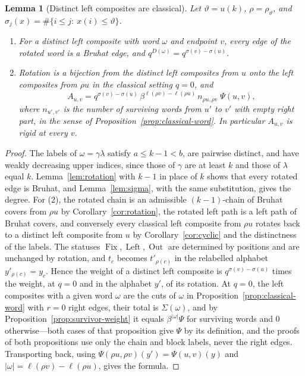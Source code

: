 \documentclass[11pt]{article}
\newtheorem{lemma}[proposition]{Lemma}
\newcommand{\Fix}{\operatorname{Fix}}
\newcommand{\Left}{\operatorname{Left}}
\newcommand{\Out}{\operatorname{Out}}
\newcommand{\ellength}{\ell}
\begin{document}
\begin{lemma}[Distinct left composites are classical]
\label{lem:distinct-rotation}
Let $\vartheta=u(k)$, $\rho=\rho_\vartheta$, and
$\sigma_j(x)=\#\{i\leq j:\ x(i)\leq\vartheta\}$.
\begin{enumerate}
\item For a distinct left composite with word $\omega$ and endpoint
 $v$, every edge of the rotated word is a Bruhat edge, and
 $q^{D(\omega)}=q^{\sigma(v)-\sigma(u)}$.
\item Rotation is a bijection from the distinct left composites from
 $u$ onto the left composites from $\rho u$ in the classical setting
 $q=0$, and
 \[
  A_{u,v}=q^{\sigma(v)-\sigma(u)}\,
   \beta^{\ellength(\rho v)-\ellength(\rho u)}\,
   n_{\rho u,\rho v}\;\Psi(u,v),
 \]
 where $n_{u',v'}$ is the number of surviving words from $u'$ to $v'$
 with empty right part, in the sense of
 Proposition~\ref{prop:classical-word}. In particular $A_{u,v}$ is
 rigid at every $v$.
\end{enumerate}
\end{lemma}

\begin{proof}
The labels of $\omega=\gamma\lambda$ satisfy $a\leq k-1<b$, are
pairwise distinct, and have weakly decreasing upper indices, since
those of $\gamma$ are at least $k$ and those of $\lambda$ equal $k$.
Lemma~\ref{lem:rotation} with $k-1$ in place of $k$ shows that every
rotated edge is Bruhat, and Lemma~\ref{lem:sigma}, with the same
substitution, gives the degree. For (2), the rotated chain is an
admissible $(k-1)$-chain of Bruhat covers from $\rho u$ by
Corollary~\ref{cor:rotation}, the rotated left path is a left path of
Bruhat covers, and conversely every classical left composite from
$\rho u$ rotates back to a distinct left composite from $u$ by
Corollary~\ref{cor:cyclic} and the distinctness of the labels. The
statuses $\Fix,\Left,\Out$ are determined by positions and are
unchanged by rotation, and $t_c$ becomes $t'_{\rho(c)}$ in the
relabelled alphabet $y'_{\rho(c)}=y_c$. Hence the weight of a distinct
left composite is $q^{\sigma(v)-\sigma(u)}$ times the weight, at $q=0$
and in the alphabet $y'$, of its rotation. At $q=0$, the left
composites with a given word $\omega$ are the cuts of $\omega$ in
Proposition~\ref{prop:classical-word} with $r=0$ right edges, their
total is $\Sigma(\omega)$, and by
Proposition~\ref{prop:survivor-weight} it equals
$\beta^{|\omega|}\Psi$ for surviving words and $0$ otherwise---both
cases of that proposition give $\Psi$ by its definition, and the
proofs of both propositions use only the chain and block labels,
never the right edges. Transporting back, using
$\Psi(\rho u,\rho v)(y')=\Psi(u,v)(y)$ and
$|\omega|=\ellength(\rho v)-\ellength(\rho u)$, gives the formula.
\end{proof}
\end{document}
